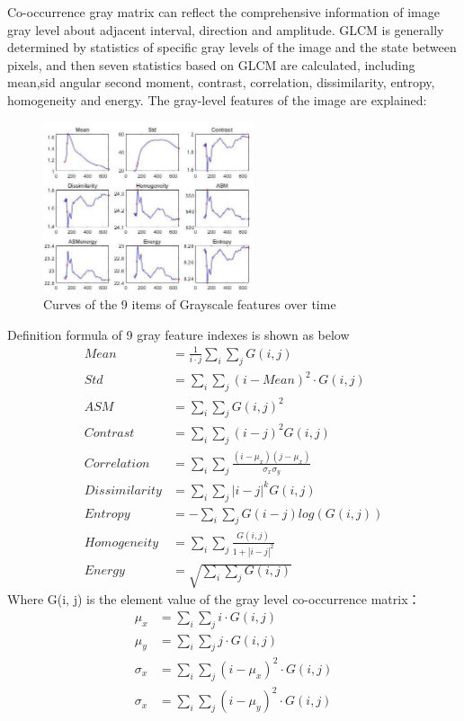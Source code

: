 \documentclass{apmcmthesis}
\begin{document}
		Co-occurrence gray matrix can reflect the comprehensive information of image gray level about adjacent interval, direction and amplitude. GLCM is generally determined by statistics of specific gray levels of the image and the state between pixels, and then seven statistics based on GLCM are calculated, including mean,sid angular second moment, contrast, correlation, dissimilarity, entropy, homogeneity and energy. The gray-level features of the image are explained:
		\begin{figure}[htbp!]
		\centering
		\includegraphics[height=5cm]{./figures/6-2-color.jpg}
		\caption{Curves of the 9 items of Grayscale features over time}
		\label{fig:9}
	\end{figure}
	
		Definition formula of 9 gray feature indexes is shown as below
			\begin{equation}
				\tag{6-2-1}
				\begin{split}
					Mean &= \frac{1}{i\cdot j}\sum_{i}\sum_{j}G(i,j) \\
					Std &= \sum_{i}\sum_{j}(i-Mean)^{2}\cdot G(i,j) \\
				   	ASM &= \sum_{i}\sum_{j}G(i,j)^{2} \\
					  Contrast &= \sum_{i}\sum_{j}(i-j)^{2}G(i,j) \\
						Correlation &= \sum_{i}\sum_{j}\frac{(i-\mu_{x})(j-\mu_{x})}{\sigma_{x}\sigma_{y}} \\
						Dissimilarity &= \sum_{i}\sum_{j}|i-j|^{k}G(i,j) \\
						Entropy &=-\sum_{i}\sum_{j}G(i-j)log(G(i,j)) \\
						Homogeneity &= \sum_{i}\sum_{j}\frac{G(i,j)}{1+|i-j|^{2}}\\
						Energy &= \sqrt{\sum_{i}\sum_{j}G(i,j)}
				\end{split}
			\end{equation}
		Where G(i, j) is the element value of the gray level co-occurrence matrix：
		\begin{equation}
			\tag{6-2-2}
			\begin{split}
				\mu_{x} &= \sum_{i}\sum_{j}i\cdot G(i,j) \\
					\mu_{y} &= \sum_{i}\sum_{j}j\cdot G(i,j) \\
						\sigma_{x} &= \sum_{i}\sum_{j}(i-\mu_{x})^{2}\cdot G(i,j) \\
			\sigma_{x} &= \sum_{i}\sum_{j}(i-\mu_{y})^{2}\cdot G(i,j) \\
			\end{split}
		\end{equation}
		
\end{document}
